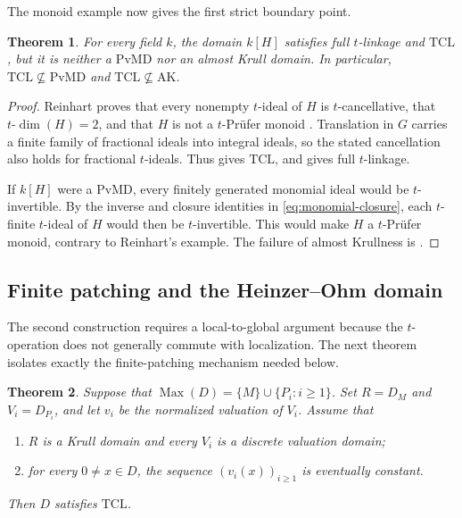 \documentclass[11pt]{amsart}
\newtheorem{theorem}{Theorem}[section]
\theoremstyle{definition}
\theoremstyle{remark}
\newcommand{\PvMD}{\mathrm{PvMD}}
\newcommand{\TCL}{\mathrm{TCL}}
\newcommand{\AK}{\mathrm{AK}}
\newcommand{\Max}{\operatorname{Max}}
\begin{document}
The monoid example now gives the first strict boundary point.

\begin{theorem}\label{thm:monoid-example}
For every field $k$, the domain $k[H]$ satisfies full $t$-linkage and
$\TCL$, but it is neither a $\PvMD$ nor an almost Krull domain.  In
particular, $\TCL\not\subseteq\PvMD$ and $\TCL\not\subseteq\AK$.
\end{theorem}

\begin{proof}
Reinhart proves that every nonempty $t$-ideal of $H$ is $t$-cancellative,
that $t\text{-}\dim(H)=2$, and that $H$ is not a $t$-Pr\"ufer monoid
\cite[Example~4.2]{Reinhart}.  Translation in $G$ carries a finite family of
fractional ideals into integral ideals, so the stated cancellation also holds
for fractional $t$-ideals.  Thus  gives $\TCL$, and
 gives full $t$-linkage.

If $k[H]$ were a $\PvMD$, every finitely generated monomial ideal would be
$t$-invertible.  By the inverse and closure identities in
\eqref{eq:monomial-closure}, each $t$-finite $t$-ideal of $H$ would then
be $t$-invertible.  This would make $H$ a $t$-Pr\"ufer monoid,
contrary to Reinhart's example.  The failure of almost Krullness is
.
\end{proof}

\subsection{Finite patching and the Heinzer--Ohm domain}

The second construction requires a local-to-global argument because the
$t$-operation does not generally commute with localization.  The next theorem
isolates exactly the finite-patching mechanism needed below.

\begin{theorem}\label{thm:patching}
Suppose that
$\Max(D)=\{M\}\cup\{P_i:i\geq1\}$.  Set $R=D_M$ and $V_i=D_{P_i}$, and let
$v_i$ be the normalized valuation of $V_i$.  Assume that
\begin{enumerate}[label=\textup{(\alph*)}]
\item $R$ is a Krull domain and every $V_i$ is a discrete valuation domain;
\item for every $0\ne x\in D$, the sequence $(v_i(x))_{i\geq1}$ is
      eventually constant.
\end{enumerate}
Then $D$ satisfies $\TCL$.
\end{theorem}
\end{document}
